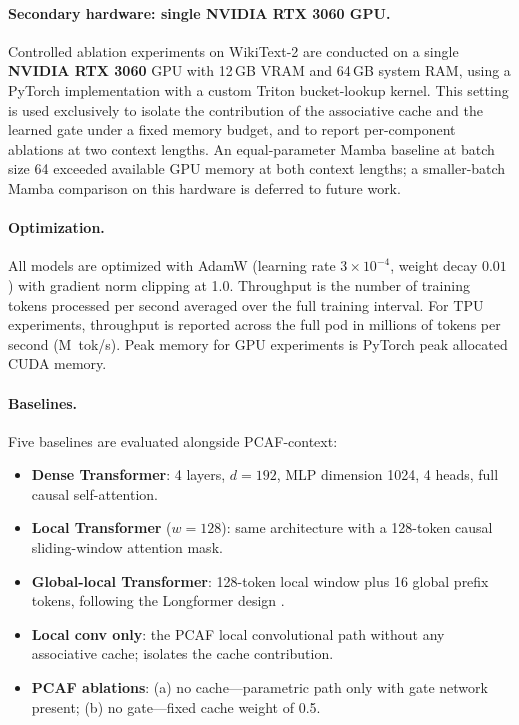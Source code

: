\documentclass{article}
\begin{document}
\paragraph{Secondary hardware: single NVIDIA RTX 3060 GPU.}
Controlled ablation experiments on WikiText-2 are conducted on a single
\textbf{NVIDIA RTX 3060} GPU with 12\,GB VRAM and 64\,GB system RAM, using a
PyTorch implementation with a custom Triton bucket-lookup kernel. This setting
is used exclusively to isolate the contribution of the associative cache and
the learned gate under a fixed memory budget, and to report per-component
ablations at two context lengths. An equal-parameter Mamba baseline at
batch size 64 exceeded available GPU memory at both context lengths; a
smaller-batch Mamba comparison on this hardware is deferred to future work.

\paragraph{Optimization.}
All models are optimized with AdamW (learning rate $3\times10^{-4}$, weight
decay $0.01$) with gradient norm clipping at 1.0. Throughput is the number of
training tokens processed per second averaged over the full training interval.
For TPU experiments, throughput is reported across the full pod in millions of
tokens per second (M~tok/s). Peak memory for GPU experiments is PyTorch peak
allocated CUDA memory.

\paragraph{Baselines.}
Five baselines are evaluated alongside PCAF-context:
\begin{itemize}
  \item \textbf{Dense Transformer}: 4 layers, $d{=}192$, MLP dimension 1024,
  4 heads, full causal self-attention.
  \item \textbf{Local Transformer} ($w{=}128$): same architecture with a
  128-token causal sliding-window attention mask.
  \item \textbf{Global-local Transformer}: 128-token local window plus 16
  global prefix tokens, following the Longformer design
  \citep{beltagy2020longformer}.
  \item \textbf{Local conv only}: the PCAF local convolutional path without
  any associative cache; isolates the cache contribution.
  \item \textbf{PCAF ablations}: (a) no cache—parametric path only with gate
  network present; (b) no gate—fixed cache weight of 0.5.
\end{itemize}
\end{document}
